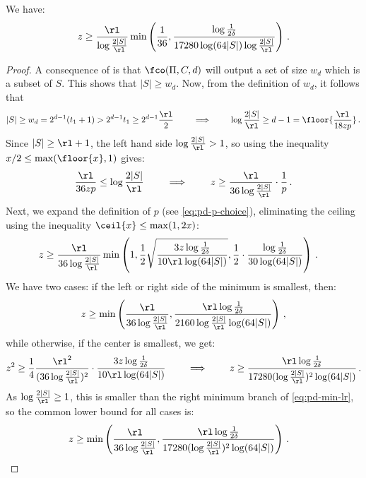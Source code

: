 \begin{itemize}
\begin{itemize}
\begin{lemma}\label{lem:pd-z-lb} 
  We have:
  \begin{align*}
    z \ge \frac{\rl}{\log\frac{2|S|}{\rl}} \min\left(\frac{1}{36},
    \frac{\log\frac{1}{2\delta}}{17280 \log(64|S|) \log\frac{2|S|}{\rl}} \right) \,.
  \end{align*}
\end{lemma}
%
\begin{proof}%
  A consequence of  is that $\fco(\Pi, C, d)$ will
  output a set of size $w_d$ which is a subset of $S$. This shows that $|S|
  \ge w_d$.  Now, from the definition of $w_d$, it follows that
  \begin{align*}
    |S| \ge w_d = 2^{d-1} (t_1 + 1) > 2^{d-1} t_1 \ge 2^{d-1} \frac{\rl}{2} \qquad \implies \qquad \log \frac{2 |S|}{\rl} \ge d - 1 = \floor{\frac{\rl}{18 z p}} \,.
  \end{align*}
  Since $|S| \ge \rl + 1$, the left hand side $\log \frac{2 |S|}{\rl} > 1$, so using the inequality $x/2 \le \max(\floor{x}, 1)$ gives:
  \begin{align*}
    \frac{\rl}{36 z p} \le \log \frac{2 |S|}{\rl} \qquad \implies \qquad z \ge \frac{\rl}{36 \log \frac{2|S|}{\rl}} \cdot \frac{1}{p} \,.
  \end{align*}
  Next, we expand the definition of $p$ (see \cref{eq:pd-p-choice}), eliminating the ceiling using the inequality $\ceil{x} \le \max(1, 2 x)$:
  \begin{align*}
    z &\ge \frac{\rl}{36 \log \frac{2|S|}{\rl}} \min\left(1, \frac{1}{2} \sqrt{ \frac{3 z \log \frac{1}{2\delta}}{10 \rl \log(64 |S|) } }, \frac{1}{2} \cdot \frac{\log \frac{1}{2\delta}}{30 \log(64 |S|) }\right) \,.
  \end{align*}
  We have two cases: if the left or right side of the minimum is smallest, then:
  \begin{align}
    z \ge \min\left( \frac{\rl}{36 \log \frac{2|S|}{\rl}}, \frac{\rl \log \frac{1}{2\delta}}{2160 \log \frac{2|S|}{\rl} \log(64|S|)} \right) \,, \label{eq:pd-min-lr}
  \end{align}
  while otherwise, if the center is smallest, we get:
  \begin{align*}
    z^2 \ge  \frac{1}{4} \frac{\rl^2}{(36 \log \frac{2|S|}{\rl})^2} \cdot \frac{3 z \log \frac{1}{2\delta}}{10 \rl \log(64 |S|) } \qquad \implies \qquad z \ge \frac{\rl \log \frac{1}{2 \delta}}{17280 (\log \frac{2|S|}{\rl})^2 \log(64|S|)} \,.
  \end{align*}
  As $\log\frac{2|S|}{\rl} \ge 1$, this is smaller than the right minimum
  branch of \cref{eq:pd-min-lr}, so the common lower bound for all cases is:
  \begin{align*}
    z &\ge \min\left( \frac{\rl}{36 \log \frac{2|S|}{\rl}}, \frac{\rl \log \frac{1}{2 \delta}}{17280 (\log \frac{2|S|}{\rl})^2 \log(64|S|)} \right) \,. \qedhere
  \end{align*}
\end{proof}
% 



\end{itemize}
\end{itemize}
